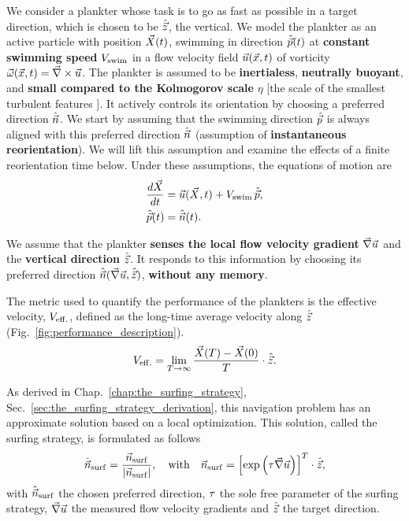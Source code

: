 We consider a plankter whose task is to go as fast as possible in a target direction, which is chosen to be $\hat{\vec{z}}$, the vertical.
We model the plankter as an active particle with position $\vec{X} (t)$, swimming in direction $\hat{\vec{p}}(t)$ at \textbf{constant swimming speed} $V_{\mathrm{swim}}$ in a flow velocity field $\vec{u} (\vec{x}, t)$ of vorticity $\vec{\omega} (\vec{x}, t) = \vec{\nabla} \times \vec{u}$.
The plankter is assumed to be \textbf{inertialess}, \textbf{neutrally buoyant}, and \textbf{small compared to the Kolmogorov scale} $\eta$ [the scale of the smallest turbulent features \citep{frisch1995turbulence}].
It actively controls its orientation by choosing a preferred direction $\hat{\vec{n}}$.
We start by assuming that the swimming direction $\hat{\vec{p}}$ is always aligned with this preferred direction $\hat{\vec{n}}$ (assumption of \textbf{instantaneous reorientation}).
We will lift this assumption and examine the effects of a finite reorientation time below.
Under these assumptions, the equations of motion are
\begin{subequations}\label{turb:eq:motion}
	\begin{align}
		\frac{d \vec{X}}{dt} & =
		 \vec{u} (\vec{X}, t) + V_{\mathrm{swim}} \, \hat{\vec{p}}, \label{turb:eq:x_motion}\\
		\hat{\vec{p}}(t) & = \hat{\vec{n}}(t) .\label{turb:eq:p_motion}
	\end{align}
\end{subequations}

We assume that the plankter \textbf{senses the local flow velocity gradient} $\vec{\nabla} \vec{u}$ and the \textbf{vertical direction} $\hat{\vec{z}}$.
It responds to this information by choosing its preferred direction $\hat{\vec{n}}(\vec{\nabla} \vec{u},\hat{\vec{z}})$, \textbf{without any memory}.

The metric used to quantify the performance of the plankters is the effective velocity, $V_{\mathrm{eff.}}$, defined as the long-time average velocity along $\hat{\vec{z}}$ (Fig.~\ref{fig:performance_description}).
\begin{equation}
	\label{turb:eq:performance}
	V_{\mathrm{eff.}} = \lim_{T\to\infty} \frac{\vec{X} (T) - \vec{X} (0)}{T} \cdot \hat{\vec{z}}.
\end{equation}

As derived in Chap.~\ref{chap:the_surfing_strategy}, Sec.~\ref{sec:the_surfing_strategy_derivation}, this navigation problem has an approximate solution based on a local optimization.
This solution, called the surfing strategy, is formulated as follows
\begin{equation}
	\label{turb:eq:surfing_swimming_direction_final}
	\hat{\vec{n}}_{\mathrm{surf}} = \frac{\vec{n}_{\mathrm{surf}}}{\lvert\vec{n}_{\mathrm{surf}}\rvert}, \quad \text{with} \quad \vec{n}_{\mathrm{surf}} = \left[ \exp \left( \tau \vec{\nabla} \vec{u} \right) \right]^T \cdot \hat{\vec{z}},
\end{equation}
with $\hat{\vec{n}}_{\mathrm{surf}}$ the chosen preferred direction, $\tau$ the sole free parameter of the surfing strategy, $\vec{\nabla} \vec{u}$ the measured flow velocity gradients and $\hat{\vec{z}}$ the target direction.


